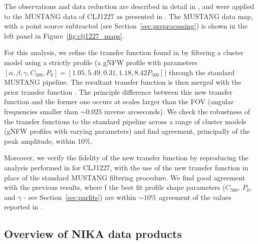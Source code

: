 \documentclass[onecolumn,traditabstract]{aa}
\begin{document}
The observations and data reduction are described in detail in \citet{romero2015a}, and were applied to the MUSTANG
data of CLJ1227 as presented in \citet{romero2017}.
The MUSTANG data map, with a point source subtracted (see Section~\ref{sec:preprocessing})
is shown in the left panel in Figure~\ref{fig:clj1227_maps}.

For this analysis, we refine the transfer function found in  \citet{romero2017} by filtering a cluster model
using a strictly  profile (a gNFW profile with parameters
$[\alpha,\beta,\gamma,C_{500},P_0]=[1.05,5.49,0.31,1.18,8.42 P_{500}]$) through the standard MUSTANG pipeline.
The resultant transfer function is then merged with the prior transfer function \citep[on white noise][]{romero2017}.
The principle difference between this new transfer function and the former one
occurs at scales larger than the FOV (angular frequencies smaller than $\sim0.025$ inverse arcseconds).
We check the robustness of the transfer functions to the standard pipeline across a range of cluster models
(gNFW profiles with varying parameters) and find agreement, principally of the peak amplitude, within 10\%.

Moreover, we verify the fidelity of the new transfer function by reproducing the analysis performed in
\citet{romero2017} for CLJ1227, with the use of the new transfer function in place of the standard MUSTANG
filtering procedure. We find good agreement with the previous results, where
f%
the best fit profile shape parameters ($C_{500}$, $P_0$, and $\gamma$ - see Section~\ref{sec:parfits})
are within $\sim10$\% agreement of the values reported in \citet{romero2017}.

\subsection{Overview of NIKA data products}
\label{sec:nikaobs}
\end{document}
